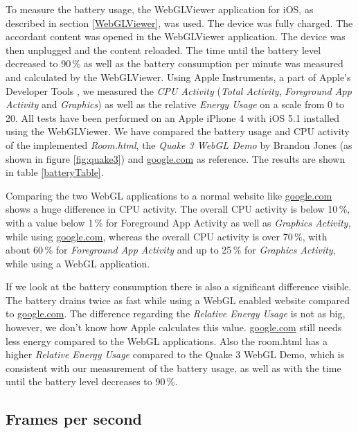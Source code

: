 \documentclass[12pt,journal,compsoc]{IEEEtran}
\begin{document}
To measure the battery usage, the WebGLViewer application for iOS, as described in section \ref{WebGLViewer}, was used. The device was fully charged. The accordant content was opened in the WebGLViewer application. The device was then unplugged and the content reloaded. The time until the battery level decreased to 90\,\% as well as the battery consumption per minute was measured and calculated by the WebGLViewer. Using Apple Instruments, a part of Apple’s Developer Tools \cite{AppleDevTools}, we measured the \textit{CPU Activity} (\textit{Total Activity}, \textit{Foreground App Activity} and \textit{Graphics}) as well as the relative \textit{Energy Usage} on a scale from 0 to 20. All tests have been performed on an Apple iPhone 4 with iOS 5.1 installed using the WebGLViewer. We have compared the battery usage and CPU activity of the implemented \textit{Room.html}, the \textit{Quake 3 WebGL Demo} by Brandon Jones \cite{quakewebgl} (as shown in figure \ref{fig:quake3}) and \url{google.com} as reference. The results are shown in table \ref{batteryTable}.

Comparing the two WebGL applications to a normal website like \url{google.com} shows a huge difference in CPU activity. The overall CPU activity is below 10\,\%, with a value below 1\,\% for Foreground App Activity as well as \textit{Graphics Activity}, while using \url{google.com}, whereas the overall CPU activity is over 70\,\%, with about 60\,\% for \textit{Foreground App Activity} and up to 25\,\% for \textit{Graphics Activity}, while using a WebGL application. 

If we look at the battery consumption there is also a significant difference visible. The battery drains twice as fast while using a WebGL enabled website compared to \url{google.com}. The difference regarding the \textit{Relative Energy Usage} is not as big, however, we don't know how Apple calculates this value. \url{google.com} still needs less energy compared to the WebGL applications. Also the room.html has a higher \textit{Relative Energy Usage} compared to the Quake 3 WebGL Demo, which is consistent with our measurement of the battery usage, as well as with the time until the battery level decreases to 90\,\%.


\subsection{Frames per second}
\end{document}
